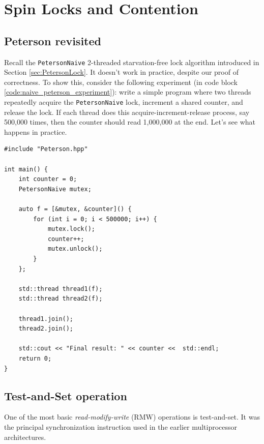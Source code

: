 \chapter{Spin Locks and Contention}\label{chp:spin_locks_contention}
\minitoc

\section{Peterson revisited}
Recall the \verb|PetersonNaive| 2-threaded starvation-free lock algorithm introduced in Section \ref{sec:PetersonLock}. It doesn't work in practice, despite our proof of correctness. To show this, consider the following experiment (in code block \ref{code:naive_peterson_experiment}): write a simple program where two threads repeatedly acquire the \verb|PetersonNaive| lock, increment a shared counter, and release the lock. If each thread does this acquire-increment-release process, say 500,000 times, then the counter should read 1,000,000 at the end. Let's see what happens in practice.

\makebox[\linewidth]{\rule{17cm}{0.4pt}}
{\centering \label{code:naive_peterson_experiment}
\begin{verbatim}
#include "Peterson.hpp"

int main() {
    int counter = 0;
    PetersonNaive mutex;

    auto f = [&mutex, &counter]() {
        for (int i = 0; i < 500000; i++) {
            mutex.lock();
            counter++;
            mutex.unlock();
        }
    };

    std::thread thread1(f);
    std::thread thread2(f);

    thread1.join();
    thread2.join();

    std::cout << "Final result: " << counter <<  std::endl;
    return 0;
}
\end{verbatim}
\makebox[\linewidth]{\rule{17cm}{0.4pt}}
}

\section{Test-and-Set operation}
One of the most basic \textit{read-modify-write} (RMW) operations is test-and-set. It was the principal synchronization instruction used in the earlier multiprocessor architectures.

